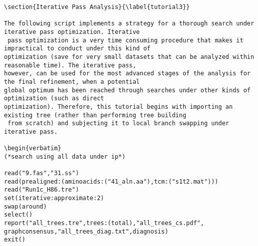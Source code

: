 \begin{verbatim}
\section{Iterative Pass Analysis}{\label{tutorial3}}

The following script implements a strategy for a thorough search under iterative pass optimization. Iterative
 pass optimization is a very time consuming procedure that makes it impractical to conduct under this kind of 
optimization (save for very small datasets that can be analyzed within reasonable time). The iterative pass, 
however, can be used for the most advanced stages of the analysis for the final refinement, when a potential 
global optimum has been reached through searches under other kinds of optimization (such as direct 
optimization). Therefore, this tutorial begins with importing an existing tree (rather than performing tree building
 from scratch) and subjecting it to local branch swapping under iterative pass.

\begin{verbatim}
(*search using all data under ip*)

read("9.fas","31.ss")
read(prealigned:(aminoacids:("41_aln.aa"),tcm:("s1t2.mat")))
read("Run1c_H86.tre")
set(iterative:approximate:2)
swap(around)
select()
report("all_trees.tre",trees:(total),"all_trees_cs.pdf",
graphconsensus,"all_trees_diag.txt",diagnosis)
exit()
\end{verbatim}

